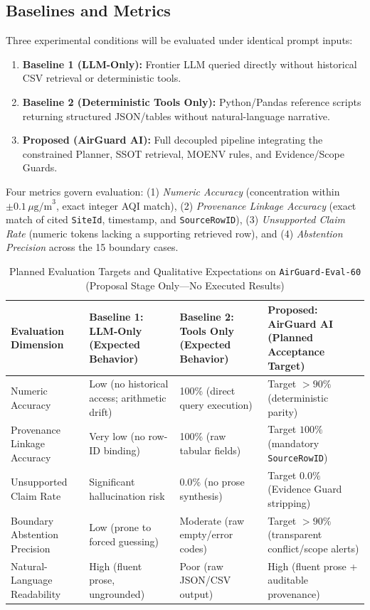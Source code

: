 \documentclass[conference]{IEEEtran}
\begin{document}
\subsection{Baselines and Metrics}
Three experimental conditions will be evaluated under identical prompt inputs:
\begin{enumerate}
    \item \textbf{Baseline 1 (LLM-Only):} Frontier LLM queried directly without historical CSV retrieval or deterministic tools.
    \item \textbf{Baseline 2 (Deterministic Tools Only):} Python/Pandas reference scripts returning structured JSON/tables without natural-language narrative.
    \item \textbf{Proposed (AirGuard AI):} Full decoupled pipeline integrating the constrained Planner, SSOT retrieval, MOENV rules, and Evidence/Scope Guards.
\end{enumerate}

Four metrics govern evaluation: (1) \emph{Numeric Accuracy} (concentration within $\pm 0.1\,\mu\text{g/m}^3$, exact integer AQI match), (2) \emph{Provenance Linkage Accuracy} (exact match of cited \texttt{SiteId}, timestamp, and \texttt{SourceRowID}), (3) \emph{Unsupported Claim Rate} (numeric tokens lacking a supporting retrieved row), and (4) \emph{Abstention Precision} across the 15 boundary cases.

\begin{table}[!t]
\centering
\caption{Planned Evaluation Targets and Qualitative Expectations on \texttt{AirGuard-Eval-60} (Proposal Stage Only---No Executed Results)}
\label{tab:eval_targets}
\footnotesize
\renewcommand{\arraystretch}{1.15}
\begin{tabularx}{\textwidth}{@{}L{3.2cm} Y Y Y@{}}
\toprule
\textbf{Evaluation Dimension} & \textbf{Baseline 1: LLM-Only (Expected Behavior)} & \textbf{Baseline 2: Tools Only (Expected Behavior)} & \textbf{Proposed: AirGuard AI (Planned Acceptance Target)} \\
\midrule
Numeric Accuracy & Low (no historical access; arithmetic drift) & 100\% (direct query execution) & Target $>90\%$ (deterministic parity) \\
Provenance Linkage Accuracy & Very low (no row-ID binding) & 100\% (raw tabular fields) & Target $100\%$ (mandatory \texttt{SourceRowID}) \\
Unsupported Claim Rate & Significant hallucination risk & $0.0\%$ (no prose synthesis) & Target $0.0\%$ (Evidence Guard stripping) \\
Boundary Abstention Precision & Low (prone to forced guessing) & Moderate (raw empty/error codes) & Target $>90\%$ (transparent conflict/scope alerts) \\
Natural-Language Readability & High (fluent prose, ungrounded) & Poor (raw JSON/CSV output) & High (fluent prose + auditable provenance) \\
\bottomrule
\end{tabularx}
\end{table}
\end{document}
